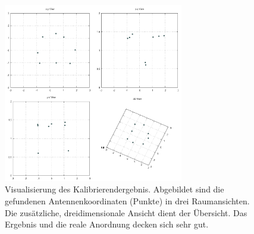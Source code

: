 \begin{figure}[ht!]
         \centering
         \includegraphics[width=0.7\textwidth]{img/calibration/calibration_results.png}
         \caption[Visualisierung des Kalibrierendergebnis]{Visualisierung des Kalibrierendergebnis. Abgebildet sind die gefundenen Antennenkoordinaten (Punkte) in drei Raumansichten. Die zusätzliche, dreidimensionale  Ansicht dient der Übersicht. Das Ergebnis und die reale Anordnung decken sich sehr gut. }
         \label{fig:3dplot_coordinates}
%
\end{figure}
%
